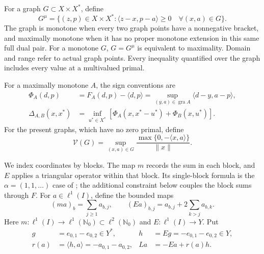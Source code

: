 \documentclass[11pt]{article}
\newcommand{\Nzero}{\mathbb N_0}
\newcommand{\gra}{\operatorname{gra}}
\newcommand{\pair}[2]{\langle #1,#2\rangle}
\begin{document}
For a graph $G\subset X\times X^*$, define
\begin{equation}
G^\mu=\{(z,p)\in X\times X^*:
 \pair{z-x}{p-a}\ge0\quad\forall(x,a)\in G\}.
\tag{D1}\label{eq:D1}
\end{equation}
The graph is monotone when every two graph points have a nonnegative bracket,
and maximally monotone when it has no proper monotone extension in this same
full dual pair. For a monotone $G$, $G=G^\mu$ is equivalent to maximality.
Domain and range refer to actual graph points. Every inequality quantified
over the graph includes every value at a multivalued primal.

For a maximally monotone $A$, the sign conventions are
\begin{equation}
\begin{aligned}
\Phi_A(d,p)&=F_A(d,p)-\pair{d}{p}
 =\sup_{(y,a)\in\gra A}\pair{d-y}{a-p},\\
\Delta_{A,B}(x,x^*)&=\inf_{u^*\in X^*}
 [\Phi_A(x,x^*-u^*)+\Phi_B(x,u^*)].
\end{aligned}
\tag{D2}\label{eq:D2}
\end{equation}
For the present graphs, which have no zero primal, define
\begin{equation}
\mathcal V(G)=\sup_{(x,a)\in G}
 \frac{\max\{0,-\pair{x}{a}\}}{\|x\|}.
\tag{D3}\label{eq:D3}
\end{equation}

We index coordinates by blocks. The map $m$ records the sum in each block,
and $E$ applies a triangular operator within that block. Its single-block
formula is the $\alpha=(1,1,\ldots)$ case of
\cite[Example~4.1]{bauschkeetal2011}; the additional constraint below
couples the block sums through $F$.
For $a\in\ell^1(I)$, define the bounded maps
\begin{equation}
(ma)_b=\sum_{j\ge1}a_{b,j},\qquad
(Ea)_{b,j}=a_{b,j}+2\sum_{k>j}a_{b,k}.
\tag{D4}\label{eq:D4}
\end{equation}
Here $m:\ell^1(I)\to\ell^1(\Nzero)\subset\ell^2(\Nzero)$ and
$E:\ell^1(I)\to Y$. Put
\begin{equation}
\begin{aligned}
g&=e_{0,1}-e_{0,2}\in Y^*,&
h&=Eg=-e_{0,1}-e_{0,2}\in Y,\\
r(a)&=\pair{h}{a}=-a_{0,1}-a_{0,2},&
La&=-Ea+r(a)h.
\end{aligned}
\tag{D5}\label{eq:D5}
\end{equation}
\end{document}
